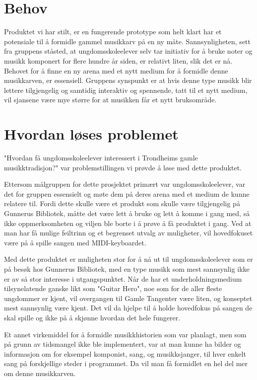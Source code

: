\section{Behov}
Produktet vi har stilt, er en fungerende prototype som helt klart har et potensiale til å formidle gammel musikkarv på en ny måte. Sannsynligheten, sett fra gruppens ståsted, at ungdomsskoleelever selv tar initiativ for å bruke noter og musikk komponert for flere hundre år siden, er relativt liten, slik det er nå. Behovet for å finne en ny arena med et nytt medium for å formidle denne musikkarven, er essensiell. Gruppens synspunkt er at hvis denne type musikk blir lettere tilgjengelig og samtidig interaktiv og spennende, tatt til et nytt medium, vil sjansene være mye større for at musikken får et nytt bruksområde.

\section{Hvordan løses problemet}
"Hvordan få ungdomsskoleelever interessert i Trondheims gamle musikktradisjon?" var problemstillingen vi prøvde å løse med dette produktet. 

Ettersom målgruppen for dette prosjektet primært var ungdomsskoleelever, var det for gruppen essensielt og møte dem på deres arena med et medium de kunne relatere til. Fordi dette skulle være et produkt som skulle være tilgjengelig på Gunnerus Bibliotek, måtte det være lett å bruke og lett å komme i gang med, så ikke oppmerksomheten og viljen ble borte i å prøve å få produktet i gang. Ved at man har få mulige feiltrinn og et begrenset utvalg av muligheter, vil hovedfokuset være på å spille sangen med MIDI-keyboardet. 

Med dette produktet er muligheten stor for å nå ut til ungdomsskoleelever som er på besøk hos Gunnerus Bibliotek, med en type musikk som mest sannsynlig ikke er av så stor interesse i utgangspunktet. Når de har et underholdningsmedium tilsynelatende ganske likt som "Guitar Hero"\cite{guitarhero}, noe som for de aller fleste ungdommer er kjent, vil overgangen til Gamle Tangenter være liten, og konseptet mest sannsynlig være kjent. Det vil da hjelpe til å holde hovedfokus på sangen de skal spille og ikke på å skjønne hvordan det hele fungerer. 

Et annet virkemiddel for å formidle musikkhistorien som var planlagt, men som på grunn av tidsmangel ikke ble implementert, var at man kunne ha bilder og informasjon om for eksempel komponist, sang, og musikksjanger, til hver enkelt sang på forskjellige steder i programmet. Da vil man få formidlet en hel del mer om denne musikkarven. 


